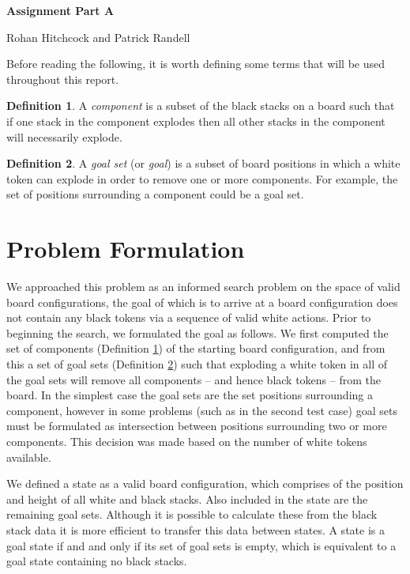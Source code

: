 \documentclass[11pt]{article}
\theoremstyle{definition}
\newtheorem{definition}{Definition} %
\begin{document}
    \begin{center}
        \textbf{\Large Assignment Part A}
        \medskip

        Rohan Hitchcock and Patrick Randell
    \end{center}
    Before reading the following, it is worth defining some terms that will be used throughout this report.
    \begin{definition} \label{defn:component}
        A \emph{component} is a subset of the black stacks on a board such that if one stack in the component explodes then all other stacks in the component will necessarily explode. 
    \end{definition}

    \begin{definition} \label{defn:goal}
        A \emph{goal set} (or \emph{goal}) is a subset of board positions in which a white token can explode in order to remove one or more components. For example, the set of positions surrounding a component could be a goal set.
    \end{definition}

    \section{Problem Formulation}\label{sec:problem-formulation}

    We approached this problem as an informed search problem on the space of valid board configurations, the goal of which is to arrive at a board configuration does not contain any black tokens via a sequence of valid white actions. Prior to beginning the search, we formulated the goal as follows. We first computed the set of components (Definition \ref{defn:component}) of the starting board configuration, and from this a set of goal sets (Definition \ref{defn:goal}) such that exploding a white token in all of the goal sets will remove all components -- and hence black tokens -- from the board. In the simplest case the goal sets are the set positions surrounding a component, however in some problems (such as in the second test case) goal sets must be formulated as intersection between positions surrounding two or more components. This decision was made based on the number of white tokens available. 

    We defined a state as a valid board configuration, which comprises of the position and height of all white and black stacks. Also included in the state are the remaining goal sets. Although it is possible to calculate these from the black stack data it is more efficient to transfer this data between states. A state is a goal state if and and only if its set of goal sets is empty, which is equivalent to a goal state containing no black stacks.
\end{document}
